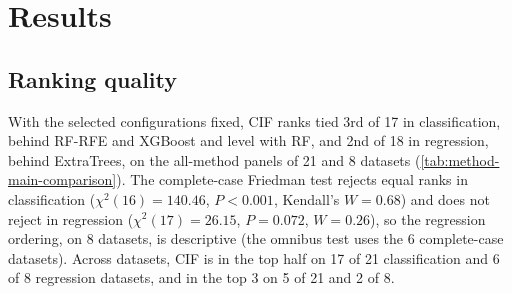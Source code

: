 \section{Results}
\label{sec:results}

\subsection{Ranking quality}
\label{sec:experiments-real}

With the selected configurations fixed, CIF ranks tied 3rd of 17 in
classification, behind RF-RFE and XGBoost and level with RF, and 2nd of 18 in
regression, behind ExtraTrees, on the all-method panels of 21 and 8 datasets
(\cref{tab:method-main-comparison}). The complete-case Friedman test rejects equal ranks in classification
($\chi^2(16)=140.46$, $P<0.001$, Kendall's $W=0.68$) and does not reject in
regression ($\chi^2(17)=26.15$, $P=0.072$, $W=0.26$), so the regression
ordering, on 8 datasets, is descriptive (the omnibus test uses the 6
complete-case datasets). Across datasets, CIF is in the top half on 17 of 21
classification and 6 of 8 regression datasets, and in the top 3 on 5 of 21 and
2 of 8.

